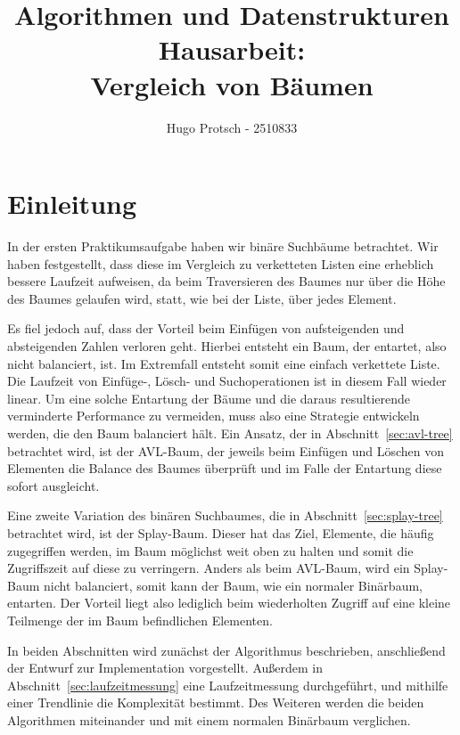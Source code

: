 \documentclass[a4paper]{article}
\title{Algorithmen und Datenstrukturen Hausarbeit:\\Vergleich von Bäumen}
\author{Hugo Protsch - 2510833}
\begin{document}
    \maketitle
    \tableofcontents
    \newpage
    \section*{Einleitung}\label{sec:Einleitung}

    In der ersten Praktikumsaufgabe haben wir binäre Suchbäume betrachtet.
    Wir haben festgestellt, dass diese im Vergleich zu verketteten Listen eine erheblich
    bessere Laufzeit aufweisen, da beim Traversieren des Baumes nur über die
    Höhe des Baumes gelaufen wird, statt, wie bei der Liste, über jedes Element.

    Es fiel jedoch auf, dass der Vorteil beim Einfügen von aufsteigenden und
    absteigenden Zahlen verloren geht.
    Hierbei entsteht ein Baum, der entartet, also nicht balanciert, ist.
    Im Extremfall entsteht somit eine einfach verkettete Liste.
    Die Laufzeit von Einfüge-, Lösch- und Suchoperationen
    ist in diesem Fall wieder linear.
    Um eine solche Entartung der Bäume und die daraus resultierende verminderte Performance
    zu vermeiden, muss also eine Strategie entwickeln werden, die den Baum balanciert hält.
    Ein Ansatz, der in Abschnitt~\ref{sec:avl-tree} betrachtet wird, ist der AVL-Baum,
    der jeweils beim Einfügen und Löschen von Elementen die
    Balance des Baumes überprüft und im Falle der Entartung diese sofort ausgleicht.

    Eine zweite Variation des binären Suchbaumes, die in Abschnitt~\ref{sec:splay-tree}
    betrachtet wird, ist der Splay-Baum.
    Dieser hat das Ziel, Elemente, die häufig zugegriffen werden, im Baum möglichst weit oben zu
    halten und somit die Zugriffszeit auf diese zu verringern.
    Anders als beim AVL-Baum, wird ein Splay-Baum nicht balanciert, somit kann der Baum, wie ein
    normaler Binärbaum, entarten.
    Der Vorteil liegt also lediglich beim wiederholten Zugriff auf eine kleine Teilmenge der im
    Baum befindlichen Elementen.

    In beiden Abschnitten wird zunächst der Algorithmus beschrieben, anschließend der Entwurf zur
    Implementation vorgestellt.
    Außerdem in Abschnitt~\ref{sec:laufzeitmessung} eine Laufzeitmessung durchgeführt, und mithilfe einer
    Trendlinie die Komplexität bestimmt.
    Des Weiteren werden die beiden Algorithmen miteinander und mit einem normalen Binärbaum
    verglichen.
\end{document}
